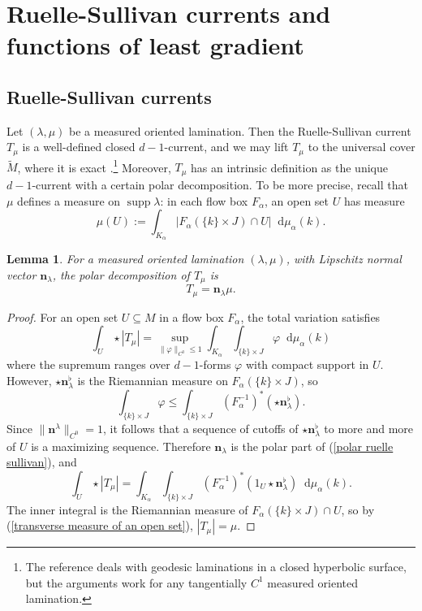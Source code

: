 \documentclass[reqno,11pt]{amsart}
\newcommand*\dif{\mathop{}\!\mathrm{d}}
\DeclareMathOperator{\supp}{supp}
\newcommand{\normal}{\mathbf n}
\newtheorem{lemma}[theorem]{Lemma}
\theoremstyle{definition}
\numberwithin{equation}{section}
\begin{document}

\section{Ruelle-Sullivan currents and functions of least gradient}\label{Prelims}
\subsection{Ruelle-Sullivan currents}\label{RS prelims}
Let $(\lambda, \mu)$ be a measured oriented lamination.
Then the Ruelle-Sullivan current $T_\mu$ is a well-defined closed $d-1$-current, and we may lift $T_\mu$ to the universal cover $\tilde M$, where it is exact \cite[\S8]{daskalopoulos2020transverse}.\footnote{The reference deals with geodesic laminations in a closed hyperbolic surface, but the arguments work for any tangentially $C^1$ measured oriented lamination.}
Moreover, $T_\mu$ has an intrinsic definition as the unique $d-1$-current with a certain polar decomposition.
To be more precise, recall that $\mu$ defines a measure on $\supp \lambda$: in each flow box $F_\alpha$, an open set $U$ has measure
\begin{equation}\label{transverse measure of an open set}
\mu(U) := \int_{K_\alpha} |F_\alpha(\{k\} \times J) \cap U| \dif \mu_\alpha(k).
\end{equation}

\begin{lemma}
For a measured oriented lamination $(\lambda, \mu)$, with Lipschitz normal vector $\normal_\lambda$, the polar decomposition of $T_\mu$ is
\begin{equation}\label{polar ruelle sullivan}
T_\mu = \normal_\lambda \mu.
\end{equation}
\end{lemma}
\begin{proof}
For an open set $U \subseteq M$ in a flow box $F_\alpha$, the total variation satisfies
$$\int_U \star |T_\mu| = \sup_{\|\varphi\|_{C^0} \leq 1} \int_{K_\alpha} \int_{\{k\} \times J} \varphi \dif \mu_\alpha(k)$$
where the supremum ranges over $d-1$-forms $\varphi$ with compact support in $U$.
However, $\star \normal_\lambda^\flat$ is the Riemannian measure on $F_\alpha(\{k\} \times J)$, so
$$\int_{\{k\} \times J} \varphi \leq \int_{\{k\} \times J} (F_\alpha^{-1})^*(\star \normal_\lambda^\flat).$$
Since $\|\normal^\lambda\|_{C^0} = 1$, it follows that a sequence of cutoffs of $\star \normal_\lambda^\flat$ to more and more of $U$ is a maximizing sequence.
Therefore $\normal_\lambda$ is the polar part of (\ref{polar ruelle sullivan}), and
$$\int_U \star |T_\mu| = \int_{K_\alpha} \int_{\{k\} \times J} (F_\alpha^{-1})^*(1_U \star \normal_\lambda^\flat) \dif \mu_\alpha(k).$$
The inner integral is the Riemannian measure of $F_\alpha(\{k\} \times J) \cap U$, so by (\ref{transverse measure of an open set}), $|T_\mu| = \mu$.
\end{proof}
\end{document}
